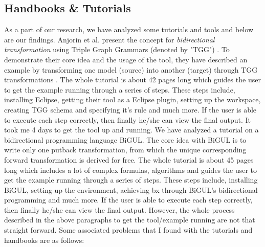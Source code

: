 \subsection{Handbooks \& Tutorials}\label{subsec:handbook}
 As a part of our research, we have analyzed some tutorials and tools and below are our findings.
\newline\newline Anjorin et al.\cite{emoflon-part4} present the concept for \textit{bidirectional transformation} using Triple Graph Grammars (denoted by "TGG") \cite{tgg}. To demonstrate their core idea and the usage of the tool, they have described an example by transforming one model (source) into another (target) through TGG transformations \cite{tgg}\cite{bx-tgg}. The whole tutorial is about 42 pages long which guides the user to get the example running through a series of steps. These steps include, installing \ac{Eclipse}, getting their tool as a Eclipse plugin, setting up the workspace, creating TGG schema and specifying it's rule and much more. If the user is able to execute each step correctly, then finally he/she can view the final output. It took me 4 days to get the tool up and running.
\newline\newline We have analyzed a tutorial\cite{bigul-tutorial} on a bidirectional programming language BiGUL\cite{bigul}. The core idea with BiGUL is to write only one putback transformation, from which the unique corresponding forward transformation is derived for free. The whole tutorial is about 45 pages long which includes a lot of complex formulas, algorithms and guides the user to get the example running through a series of steps. These steps include, installing BiGUL, setting up the environment, achieving bx through BiGUL's bidirectional programming and much more. If the user is able to execute each step correctly, then finally he/she can view the final output. 
\newline\newline However, the whole process described in the above paragraphs to get the tool/example running are not that straight forward. Some associated problems that I found with the tutorials and handbooks are as follows: 
